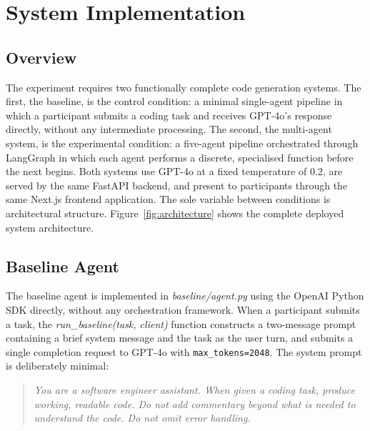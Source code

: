 
\section{System Implementation}

\subsection{Overview}

The experiment requires two functionally complete code generation systems. The first, the baseline, is the control condition: a minimal single-agent pipeline in which a participant submits a coding task and receives GPT-4o's response directly, without any intermediate processing. The second, the multi-agent system, is the experimental condition: a five-agent pipeline orchestrated through LangGraph in which each agent performs a discrete, specialised function before the next begins. Both systems use GPT-4o at a fixed temperature of 0.2, are served by the same FastAPI backend, and present to participants through the same Next.js frontend application. The sole variable between conditions is architectural structure. Figure~\ref{fig:architecture} shows the complete deployed system architecture.

\subsection{Baseline Agent}

The baseline agent is implemented in \textit{baseline/agent.py} using the OpenAI Python SDK directly, without any orchestration framework. When a participant submits a task, the \textit{run\_baseline(task, client)} function constructs a two-message prompt containing a brief system message and the task as the user turn, and submits a single completion request to GPT-4o with \texttt{max\_tokens=2048}. The system prompt is deliberately minimal:

\begin{quote}
\textit{You are a software engineer assistant. When given a coding task, produce working, readable code. Do not add commentary beyond what is needed to understand the code. Do not omit error handling.}
\end{quote}

